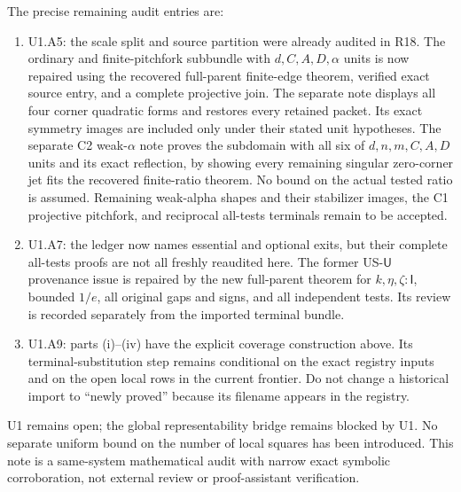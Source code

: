 \documentclass[11pt]{article}
\newcommand{\I}{\mathsf I}
\newcommand{\U}{\mathsf U}
\begin{document}
The precise remaining audit entries are:
\begin{enumerate}
\item U1.A5: the scale split and source partition were already audited
in R18. The ordinary and finite-pitchfork subbundle with
$d,C,A,D,\alpha$ units is now repaired using the recovered full-parent
finite-edge theorem, verified exact source entry, and a complete
projective join. The separate note displays all four corner quadratic
forms and restores every retained packet. Its exact symmetry images
are included only under their stated unit hypotheses. The separate C2
weak-$\alpha$ note proves the subdomain with all six of
$d,n,m,C,A,D$ units and its exact reflection, by showing every
remaining singular zero-corner jet fits the recovered finite-ratio
theorem. No bound on the actual tested ratio is assumed. Remaining
weak-alpha shapes and their stabilizer images, the C1 projective
pitchfork, and reciprocal all-tests terminals remain to be accepted.
\item U1.A7: the ledger now names essential and optional exits, but
their complete all-tests proofs are not all freshly reaudited here.
The former US-$\U$ provenance issue is repaired by the new full-parent
theorem for $k,\eta,\zeta:\I$, bounded $1/e$, all original gaps and
signs, and all independent tests. Its review is recorded separately
from the imported terminal bundle.
\item U1.A9: parts (i)--(iv) have the explicit coverage construction
above. Its terminal-substitution step remains conditional on the exact
registry inputs and on the open local rows in the
current frontier. Do not change a historical import to ``newly proved''
because its filename appears in the registry.
\end{enumerate}
U1 remains open; the global representability bridge remains blocked by
U1. No separate uniform bound on the number of local squares has been
introduced. This note is a same-system mathematical audit with narrow
exact symbolic corroboration, not external review or proof-assistant
verification.
\end{document}
